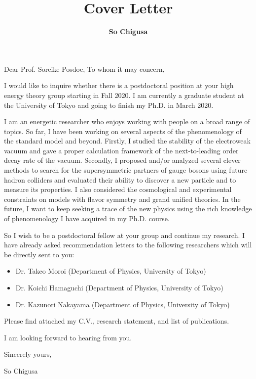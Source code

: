 \documentclass[12pt,notitlepage]{article}
\title{\vspace*{-3cm}Cover Letter}
\author{\textbf{So Chigusa}}
\date{}
\def\professorname{Soreike Posdoc}
\begin{document}
\maketitle
\thispagestyle{empty}

\ifthenelse{\isundefined{\noprofessorname}}
{Dear Prof. \professorname,}
{To whom it may concern,}

\vspace{5mm}
I would like to inquire whether there is a postdoctoral position at your high energy theory group starting in Fall 2020.
I am currently a graduate student at the University of Tokyo and going to finish my Ph.D. in March 2020.

I am an energetic researcher who enjoys working with people on a broad range of topics.
So far, I have been working on several aspects of the phenomenology of the standard model and beyond.
Firstly, I studied the stability of the electroweak vacuum and gave a proper calculation framework of the next-to-leading order decay rate of the vacuum.
Secondly, I proposed and/or analyzed several clever methods to search for the supersymmetric partners of gauge bosons using future hadron colliders and evaluated their ability to discover a new particle and to measure its properties.
I also considered the cosmological and experimental constraints on models with flavor symmetry and grand unified theories.
In the future, I want to keep seeking a trace of the new physics using the rich knowledge of phenomenology I have acquired in my Ph.D. course.

So I wish to be a postdoctoral fellow at your group and continue my research.
I have already asked recommendation letters to the following researchers which will be directly sent to you:
\vspace{-2mm}
\begin{itemize}
  \setlength{\parskip}{1mm}
  \setlength{\itemsep}{0cm}
  \item Dr. Takeo Moroi (Department of Physics, University of Tokyo)
  \item Dr. Koichi Hamaguchi (Department of Physics, University of Tokyo)
  \item Dr. Kazunori Nakayama (Department of Physics, University of Tokyo)
\end{itemize}
\vspace{-2mm}
Please find attached my C.V., research statement, and list of publications.

I am looking forward to hearing from you.

\vspace{5mm}
Sincerely yours,

\vspace{5mm}
So Chigusa
\end{document}
